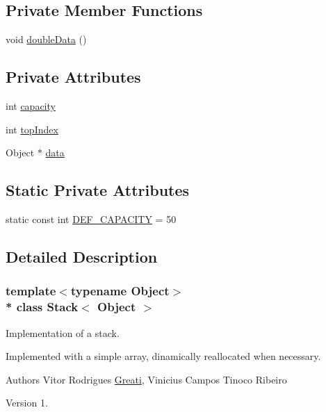 \subsection*{Private Member Functions}
\begin{DoxyCompactItemize}
\item 
void \hyperlink{classStack_aa0b9a1c9447e1abaa6e53c84b6a9aaa8}{double\+Data} ()
\end{DoxyCompactItemize}
\subsection*{Private Attributes}
\begin{DoxyCompactItemize}
\item 
int \hyperlink{classStack_aa665dd77e374b82bb86e1fce27308439}{capacity}
\item 
int \hyperlink{classStack_a474893fc0e2f8f87ccd70c09d022439c}{top\+Index}
\item 
Object $\ast$ \hyperlink{classStack_a3d78e7aef171483f22406e598892b7a2}{data}
\end{DoxyCompactItemize}
\subsection*{Static Private Attributes}
\begin{DoxyCompactItemize}
\item 
static const int \hyperlink{classStack_ace70f66cadde9cb3a090e6915eb529aa}{D\+E\+F\+\_\+\+C\+A\+P\+A\+C\+I\+TY} = 50
\end{DoxyCompactItemize}


\subsection{Detailed Description}
\subsubsection*{template$<$typename Object$>$\\*
class Stack$<$ Object $>$}

Implementation of a stack. 

Implemented with a simple array, dinamically reallocated when necessary. \begin{DoxyAuthor}{Authors}
Vitor Rodrigues \hyperlink{namespaceGreati}{Greati}, Vinicius Campos Tinoco Ribeiro 
\end{DoxyAuthor}
\begin{DoxyVersion}{Version}
1. 
\end{DoxyVersion}


